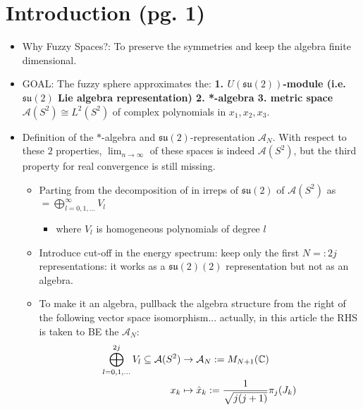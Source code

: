 \documentclass{article}
\newcommand{\alg}[1]{\ensuremath{\mathfrak{#1}}}
\newcommand{\sut}{\ensuremath{\mathfrak{su}(2)}}
\begin{document}
\section{Introduction (pg. 1)}

    \begin{itemize}
        
    \item Why Fuzzy Spaces?: To preserve the symmetries and keep the algebra finite dimensional.    
    
    \item GOAL: The fuzzy sphere approximates the: \textbf{1. $U(\alg{su}(2))$-module (i.e. $\alg{su}(2)$ Lie algebra representation) 2. *-algebra 3. metric space} $\mathcal A(S^2) \cong L^2(S^2)$ of complex polynomials in $x_1, x_2, x_3$.
        
    \item Definition of the $*$-algebra and $\alg{\sut}$-representation $\mathcal A_N$. With respect to these $2$ properties, $\lim_{n \to \infty}$ of these spaces is indeed $\mathcal A(S^2)$, but the third property for real convergence is still missing.
    
        \begin{itemize}
            
        \item Parting from the decomposition of in irreps of $\alg{su}(2)$ of $\mathcal{A}(S^2)$ as $ = \bigoplus_{l =  0, 1, \dots}^\infty V_l$
        
            \begin{itemize}
                
            \item where $V_l$ is homogeneous polynomials of degree $l$
                
            \end{itemize}
        
        \item Introduce cut-off in the energy spectrum: keep only the first $N =: 2j$ representations: it works as a $\sut(2)$ representation but not as an algebra.
        
        \item To make it an algebra, pullback the algebra structure from the right of the following vector space isomorphism... actually, in this article the RHS is taken to BE the $\mathcal A_N$:
        \begin{align}
            \bigoplus_{l =  0, 1, \dots}^{2j} V_l \subseteq \mathcal{A}(S^2) &\to \mathcal A_N := M_{N+1}(\mathbb{C})\\
            x_k &\mapsto \hat x_k := \frac{1}{\sqrt{j(j+1)}}\pi_j(J_k)
        \end{align}
        

\end{itemize}
\end{itemize}
\end{document}

